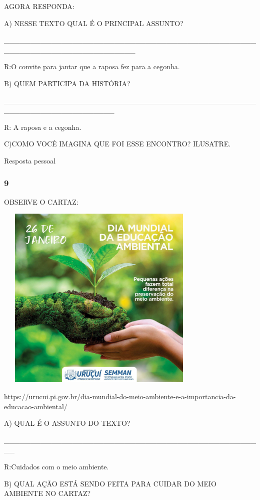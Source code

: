 AGORA RESPONDA:

A) NESSE TEXTO QUAL É O PRINCIPAL ASSUNTO?

\_\_\_\_\_\_\_\_\_\_\_\_\_\_\_\_\_\_\_\_\_\_\_\_\_\_\_\_\_\_\_\_\_\_\_\_\_\_\_\_\_\_\_\_\_\_\_\_\_\_\_\_\_\_\_\_\_\_\_\_\_\_\_\_\_\_\_\_\_\_\_\_\_

R:O convite para jantar que a raposa fez para a cegonha.

B) QUEM PARTICIPA DA HISTÓRIA?

\_\_\_\_\_\_\_\_\_\_\_\_\_\_\_\_\_\_\_\_\_\_\_\_\_\_\_\_\_\_\_\_\_\_\_\_\_\_\_\_\_\_\_\_\_\_\_\_\_\_\_\_\_\_\_\_\_\_\_\_\_\_\_\_\_\_\_\_\_

R: A raposa e a cegonha.

C)COMO VOCÊ IMAGINA QUE FOI ESSE ENCONTRO? ILUSATRE.

Resposta pessoal

\subsubsection{9 }\label{section-63}

OBSERVE O CARTAZ:

\includegraphics[width=3.96154in,height=3.50028in]{media/image123.jpeg}

https://urucui.pi.gov.br/dia-mundial-do-meio-ambiente-e-a-importancia-da-educacao-ambiental/

A) QUAL É O ASSUNTO DO TEXTO?

\_\_\_\_\_\_\_\_\_\_\_\_\_\_\_\_\_\_\_\_\_\_\_\_\_\_\_\_\_\_\_\_\_\_\_\_\_\_\_\_\_\_\_\_\_\_\_\_\_\_

R:Cuidados com o meio ambiente.

B) QUAL AÇÃO ESTÁ SENDO FEITA PARA CUIDAR DO MEIO AMBIENTE NO CARTAZ?

